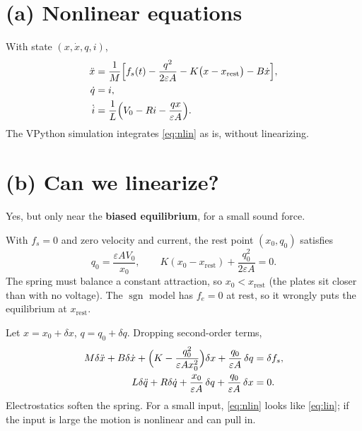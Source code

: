 \documentclass[11pt,a4paper]{article}
\begin{document}
\section{(a) Nonlinear equations}

With state \((x,\dot{x},q,i)\),
\begin{equation}
\begin{aligned}
  \ddot{x}&=\frac{1}{M}\Bigl[f_s(t)-\frac{q^2}{2\varepsilon A}
           -K\bigl(x-x_{\mathrm{rest}}\bigr)-B\dot{x}\Bigr],\\
  \dot{q}&=i,\\
  \dot{i}&=\frac{1}{L}\Bigl(V_0-Ri-\frac{qx}{\varepsilon A}\Bigr).
\end{aligned}
\label{eq:nlin}
\end{equation}
The VPython simulation integrates \eqref{eq:nlin} as is, without linearizing.

\section{(b) Can we linearize?}

Yes, but only near the \textbf{biased equilibrium}, for a small sound force.

With \(f_s=0\) and zero velocity and current, the rest point \((x_0,q_0)\) satisfies
\begin{equation}
  q_0=\frac{\varepsilon A V_0}{x_0},\qquad
  K(x_0-x_{\mathrm{rest}})+\frac{q_0^2}{2\varepsilon A}=0.
\label{eq:eqpt}
\end{equation}
The spring must balance a constant attraction, so \(x_0<x_{\mathrm{rest}}\)
(the plates sit closer than with no voltage). The \(\operatorname{sgn}\) model has \(f_e=0\) at rest,
so it wrongly puts the equilibrium at \(x_{\mathrm{rest}}\).

Let \(x=x_0+\delta x\), \(q=q_0+\delta q\). Dropping second-order terms,
\begin{equation}
\begin{aligned}
  M\delta\ddot{x}+B\delta\dot{x}
  +\Bigl(K-\frac{q_0^2}{\varepsilon A x_0^2}\Bigr)\delta x
  +\frac{q_0}{\varepsilon A}\,\delta q
  &=\delta f_s,\\
  L\delta\ddot{q}+R\delta\dot{q}
  +\frac{x_0}{\varepsilon A}\,\delta q
  +\frac{q_0}{\varepsilon A}\,\delta x
  &=0.
\end{aligned}
\label{eq:lin}
\end{equation}
Electrostatics soften the spring. For a small input, \eqref{eq:nlin} looks like \eqref{eq:lin};
if the input is large the motion is nonlinear and can pull in.
\end{document}

